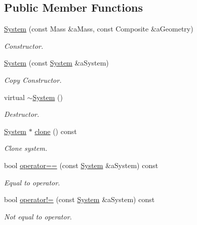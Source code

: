 \subsection*{Public Member Functions}
\begin{DoxyCompactItemize}
\item 
\hyperlink{classostk_1_1astro_1_1flight_1_1_system_afac17c0d5e2b1fb9416babf240a1aa65}{System} (const Mass \&a\+Mass, const Composite \&a\+Geometry)
\begin{DoxyCompactList}\small\item\em Constructor. \end{DoxyCompactList}\item 
\hyperlink{classostk_1_1astro_1_1flight_1_1_system_a01f4e86fb2ffa95f70cd56b1ff1c80e7}{System} (const \hyperlink{classostk_1_1astro_1_1flight_1_1_system}{System} \&a\+System)
\begin{DoxyCompactList}\small\item\em Copy Constructor. \end{DoxyCompactList}\item 
virtual \hyperlink{classostk_1_1astro_1_1flight_1_1_system_a465eb91f18cbc10466b30694daab39fd}{$\sim$\+System} ()
\begin{DoxyCompactList}\small\item\em Destructor. \end{DoxyCompactList}\item 
\hyperlink{classostk_1_1astro_1_1flight_1_1_system}{System} $\ast$ \hyperlink{classostk_1_1astro_1_1flight_1_1_system_ade321754db6db7f635def34cb137d9c4}{clone} () const
\begin{DoxyCompactList}\small\item\em Clone system. \end{DoxyCompactList}\item 
bool \hyperlink{classostk_1_1astro_1_1flight_1_1_system_a8d8602da9451044f9810eaf22076b852}{operator==} (const \hyperlink{classostk_1_1astro_1_1flight_1_1_system}{System} \&a\+System) const
\begin{DoxyCompactList}\small\item\em Equal to operator. \end{DoxyCompactList}\item 
bool \hyperlink{classostk_1_1astro_1_1flight_1_1_system_a5426b85c139cf30be998e0a983fe5978}{operator!=} (const \hyperlink{classostk_1_1astro_1_1flight_1_1_system}{System} \&a\+System) const
\begin{DoxyCompactList}\small\item\em Not equal to operator. \end{DoxyCompactList}\item 

\end{DoxyCompactItemize}
